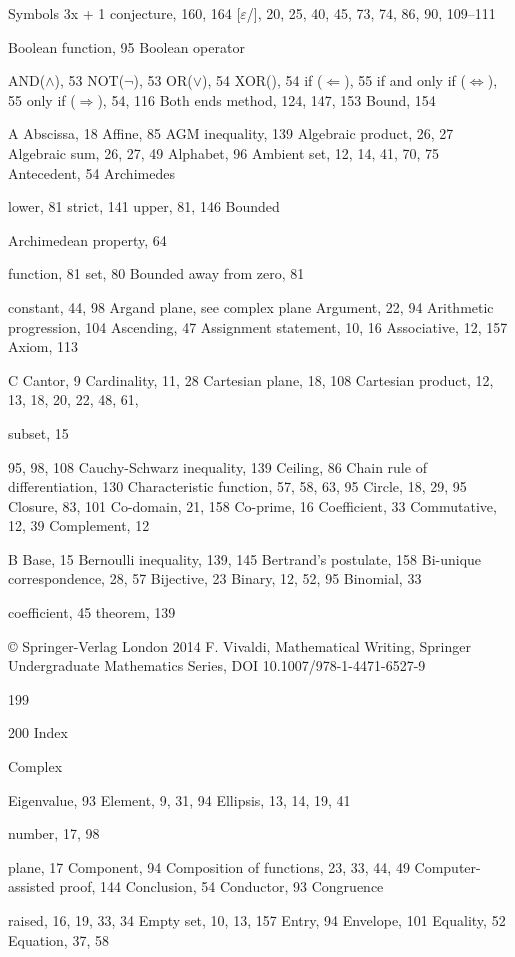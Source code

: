 \documentclass[11pt]{article}
\theoremstyle{plain}
\theoremstyle{definition}
\begin{document}
Symbols 3x + 1 conjecture, 160, 164 [$\varepsilon$/], 20, 25, 40, 45, 73, 74, 86, 90, 109--111

Boolean function, 95 Boolean operator

AND($\land$), 53 NOT($\neg$), 53 OR($\lor$), 54 XOR(), 54 if ($\Leftarrow$), 55 if and only if ($\Leftrightarrow$), 55 only if ($\Rightarrow$), 54, 116 Both ends method, 124, 147, 153 Bound, 154

A Abscissa, 18 Affine, 85 AGM inequality, 139 Algebraic product, 26, 27 Algebraic sum, 26, 27, 49 Alphabet, 96 Ambient set, 12, 14, 41, 70, 75 Antecedent, 54 Archimedes

lower, 81 strict, 141 upper, 81, 146 Bounded

Archimedean property, 64

function, 81 set, 80 Bounded away from zero, 81

constant, 44, 98 Argand plane, see complex plane Argument, 22, 94 Arithmetic progression, 104 Ascending, 47 Assignment statement, 10, 16 Associative, 12, 157 Axiom, 113

C Cantor, 9 Cardinality, 11, 28 Cartesian plane, 18, 108 Cartesian product, 12, 13, 18, 20, 22, 48, 61,

subset, 15

95, 98, 108 Cauchy-Schwarz inequality, 139 Ceiling, 86 Chain rule of differentiation, 130 Characteristic function, 57, 58, 63, 95 Circle, 18, 29, 95 Closure, 83, 101 Co-domain, 21, 158 Co-prime, 16 Coefficient, 33 Commutative, 12, 39 Complement, 12

B Base, 15 Bernoulli inequality, 139, 145 Bertrand's postulate, 158 Bi-unique correspondence, 28, 57 Bijective, 23 Binary, 12, 52, 95 Binomial, 33

coefficient, 45 theorem, 139

© Springer-Verlag London 2014 F. Vivaldi, Mathematical Writing, Springer Undergraduate Mathematics Series, DOI 10.1007/978-1-4471-6527-9

199

200 Index

Complex

Eigenvalue, 93 Element, 9, 31, 94 Ellipsis, 13, 14, 19, 41

number, 17, 98

plane, 17 Component, 94 Composition of functions, 23, 33, 44, 49 Computer-assisted proof, 144 Conclusion, 54 Conductor, 93 Congruence

raised, 16, 19, 33, 34 Empty set, 10, 13, 157 Entry, 94 Envelope, 101 Equality, 52 Equation, 37, 58
\end{document}
